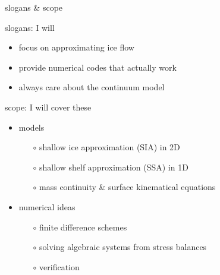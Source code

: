 



\begin{frame}{slogans \& scope}

slogans: I will
  \begin{itemize}
  \item \alert{focus on approximating ice flow}
  \item \alert{provide numerical codes that actually work}
  \item \alert{always care about the continuum model}
  \end{itemize}
\medskip

scope: I will cover these
  \begin{itemize}
  \item models

    \begin{itemize}
    \item[$\circ$] shallow ice approximation (SIA) in 2D
    \item[$\circ$] shallow shelf approximation (SSA) in 1D
    \item[$\circ$] mass continuity \& surface kinematical equations
    \end{itemize}

  \item numerical ideas

    \begin{itemize}
    \item[$\circ$] finite difference schemes
    \item[$\circ$] solving algebraic systems from stress balances
    \item[$\circ$] verification
    \end{itemize}
  \end{itemize}
\end{frame}


